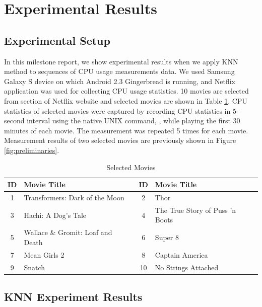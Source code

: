 \section{Experimental Results}
\label{sec:experiments}

\subsection{Experimental Setup}


In this milestone report, we show experimental results when we apply KNN method to sequences of CPU usage measurements data.
We used Samsung Galaxy S device on which Android 2.3 Gingerbread is running, and Netflix application was used for collecting CPU usage statistics.
10 movies are selected from  section of Netflix website and selected movies are shown in Table \ref{tab:movies}.
CPU statistics of selected movies were captured by recording CPU statistics in 5-second interval using the native UNIX command, , while playing the first 30 minutes of each movie. 
The measurement was repeated 5 times for each movie.
Measurement results of two selected movies are previously shown in Figure \ref{fig:preliminaries}.

\begin{table}[h!]
\vspace{-5mm}
\begin{center}
\begin{tabular}{|c|l|c|l|}
\hline
ID & Movie Title & ID & Movie Title \\ 
\hline
1 & Transformers: Dark of the Moon 		& 2 & Thor \\
3 & Hachi: A Dog's Tale 			& 4 & The True Story of Puss 'n Boots \\
5 & Wallace \& Gromit: Loaf and Death 	& 6 & Super 8 \\
7 & Mean Girls 2 				& 8 & Captain America \\
9 & Snatch 					& 10 & No Strings Attached \\
\hline
\end{tabular}
\end{center}
\caption{Selected Movies}
\label{tab:movies}
\end{table}
\vspace{-15mm}

\subsection{KNN Experiment Results}

